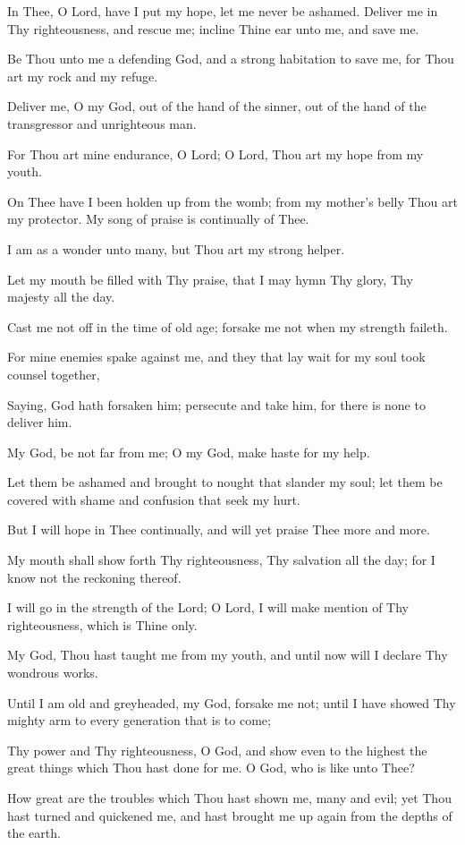 In Thee, O Lord, have I put my hope, let me never be ashamed. Deliver me in Thy righteousness, and rescue me; incline Thine ear unto me, and save me.

Be Thou unto me a defending God, and a strong habitation to save me, for Thou art my rock and my refuge.

Deliver me, O my God, out of the hand of the sinner, out of the hand of the transgressor and unrighteous man.

For Thou art mine endurance, O Lord; O Lord, Thou art my hope from my youth.

On Thee have I been holden up from the womb; from my mother's belly Thou art my protector. My song of praise is continually of Thee.

I am as a wonder unto many, but Thou art my strong helper.

Let my mouth be filled with Thy praise, that I may hymn Thy glory, Thy majesty all the day.

Cast me not off in the time of old age; forsake me not when my strength faileth.

For mine enemies spake against me, and they that lay wait for my soul took counsel together,

Saying, God hath forsaken him; persecute and take him, for there is none to deliver him.

My God, be not far from me; O my God, make haste for my help.

Let them be ashamed and brought to nought that slander my soul; let them be covered with shame and confusion that seek my hurt.

But I will hope in Thee continually, and will yet praise Thee more and more.

My mouth shall show forth Thy righteousness, Thy salvation all the day; for I know not the reckoning thereof.

I will go in the strength of the Lord; O Lord, I will make mention of Thy righteousness, which is Thine only.

My God, Thou hast taught me from my youth, and until now will I declare Thy wondrous works.

Until I am old and greyheaded, my God, forsake me not; until I have showed Thy mighty arm to every generation that is to come;

Thy power and Thy righteousness, O God, and show even to the highest the great things which Thou hast done for me. O God, who is like unto Thee?

How great are the troubles which Thou hast shown me, many and evil; yet Thou hast turned and quickened me, and hast brought me up again from the depths of the earth.

